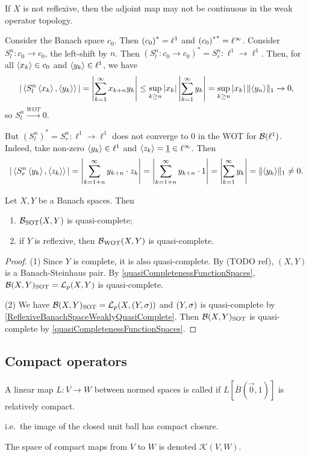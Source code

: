 \begin{example}
If $X$ is not reflexive, then the adjoint map may not be continuous in the weak operator topology.

Consider the Banach space $c_0$. Then ${(c_0)}^* = \ell^1$ and ${{(c_0)}^*}^* = \ell^\infty$. Consider $S_l^n: c_0 \to c_0$, the left-shift by $n$. Then $(S_l^n: c_0 \to c_0)^* = S_r^n: \ell^1 \to \ell^1$. Then, for all $\left\langle x_k \right\rangle \in c_0$ and $\left\langle y_k \right\rangle\in \ell^1$, we have
\[ |\left\langle S_l^n\left\langle x_k \right\rangle, \left\langle y_k \right\rangle \right\rangle| = \left|\sum_{k=1}^\infty x_{k+n}y_k \right| \leq \sup_{k\geq n}|x_k|\left|\sum_{k=1}^\infty y_k \right| = \sup_{k\geq n}|x_k|\,\lVert\left\langle y_n \right\rangle\rVert_1 \to 0, \]
so $S_l^n \overset{WOT}{\longrightarrow} 0$.

But $(S_l^n)^* = S_r^n: \ell^1\to \ell^1$ does not converge to $0$ in the WOT for $\operatorname{\mathcal{B}}(\ell^1)$. Indeed, take non-zero $\left\langle y_k \right\rangle\in \ell^1$ and $\left\langle z_k \right\rangle = \underline{1} \in \ell^\infty$.
Then
\[ |\left\langle S_r^n\left\langle y_k \right\rangle, \left\langle z_k \right\rangle \right\rangle| = \left|\sum_{k=1+n}^\infty y_{k+n}\cdot z_k \right| = \left|\sum_{k=1+n}^\infty y_{k+n}\cdot 1 \right| = \left|\sum_{k=1}^\infty y_{k} \right| = \lVert\left\langle y_k \right\rangle\rVert_1 \neq 0. \]
\end{example}

\begin{proposition}
Let $X, Y$ be a Banach spaces. Then
\begin{enumerate}
\item $\operatorname{\mathcal{B}}_{\text{SOT}}(X,Y)$ is quasi-complete;
\item if $Y$ is reflexive, then $\operatorname{\mathcal{B}}_{\text{WOT}}(X,Y)$ is quasi-complete.
\end{enumerate}
\end{proposition}
\begin{proof}
(1) Since $Y$ is complete, it is also quasi-complete. By (TODO ref), $(X,Y)$ is a Banach-Steinhaus pair. By \ref{quasiCompletenessFunctionSpaces}, $\operatorname{\mathcal{B}}(X,Y)_\text{SOT} = \operatorname{\mathcal{L}}_p(X,Y)$ is quasi-complete.

(2) We have $\Bounded(X,Y)_\text{SOT} = \contLin_p(X,\sSet{Y,\sigma})$ and $\sSet{Y,\sigma}$ is quasi-complete by \ref{ReflexiveBanachSpaceWeaklyQuasiComplete}. Then $\operatorname{\mathcal{B}}(X,Y)_\text{SOT}$ is quasi-complete by \ref{quasiCompletenessFunctionSpaces}.
\end{proof}



\subsection{Compact operators}
\begin{definition}
A linear map $L:V\to W$ between normed spaces is called  if $L[\overline{B}(\vec{0}, 1)]$ is relatively compact.

i.e.\ the image of the closed unit ball has compact closure.

The space of compact maps from $V$ to $W$ is denoted $\mathcal{K}(V,W)$.
\end{definition}

